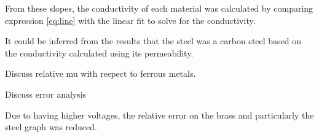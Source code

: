 \documentclass[a4paper,12pt,twocolumn]{article}
\begin{document}
	From these slopes, the conductivity of each material was calculated by comparing expression \ref{eq:line} with the linear fit to solve for the conductivity.\\
	
	\begin{equation}
		
	\end{equation}
	
	It could be inferred from the results that the steel was a carbon steel based on the conductivity calculated using its permeability.
	
	Discuss relative mu with respect to ferrous metals.
	
	Discuss error analysis
	
	Due to having higher voltages, the relative error on the brass and particularly the steel graph was reduced.
	
\end{document}
